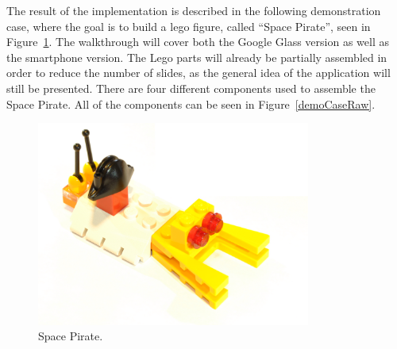 The result of the implementation is described in the following demonstration case, where the goal is to build a lego figure, called ``Space Pirate'', seen in Figure~\ref{demoCaseGoal}. The walkthrough will cover both the Google Glass version as well as the smartphone version. The Lego parts will already be partially assembled in order to reduce the number of slides, as the general idea of the application will still be presented. There are four different components used to assemble the Space Pirate. All of the components can be seen in Figure~\ref{demoCaseRaw}.

	\begin{figure}[H]%
		\centering
		\includegraphics[width=90mm]{images/rawImages/BILD_6}
		\caption{Space Pirate.}
		\label{demoCaseGoal}
	\end{figure}

